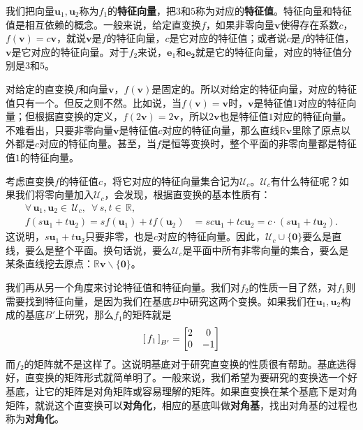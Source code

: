 \documentclass[12pt,UTF8]{ctexbook}
\begin{document}
我们把向量$\mathbf{u}_1,\mathbf{u}_2$称为$f_1$的\textbf{特征向量}，把$3$和$5$称为对应的\textbf{特征值}。特征向量和特征值是相互依赖的概念。一般来说，给定直变换$f$，如果非零向量$\mathbf{v}$使得存在系数$c$，$f(\mathbf{v}) = c\mathbf{v}$，就说$\mathbf{v}$是$f$的特征向量，$c$是它对应的特征值；或者说$c$是$f$的特征值，$\mathbf{v}$是它对应的特征向量。对于$f_2$来说，$\mathbf{e}_1$和$\mathbf{e_2}$就是它的特征向量，对应的特征值分别是$3$和$5$。

对给定的直变换$f$和向量$\mathbf{v}$，$f(\mathbf{v})$是固定的。所以对给定的特征向量，对应的特征值只有一个。但反之则不然。比如说，当$f(\mathbf{v}) = \mathbf{v}$时，$\mathbf{v}$是特征值$1$对应的特征向量；但根据直变换的定义，$f(2\mathbf{v}) = 2\mathbf{v}$，所以$2\mathbf{v}$也是特征值$1$对应的特征向量。不难看出，只要非零向量$\mathbf{v}$是特征值$c$对应的特征向量，那么直线$\mathbb{R}\mathbf{v}$里除了原点以外都是$c$对应的特征向量。甚至，当$f$是恒等变换时，整个平面的非零向量都是特征值$1$的特征向量。

考虑直变换$f$的特征值$c$，将它对应的特征向量集合记为$\mathcal{U}_c$。$\mathcal{U}_c$有什么特征呢？如果我们将零向量加入$\mathcal{U}_c$，会发现，根据直变换的基本性质有：
\begin{align*}
\forall\,\mathbf{u}_1,\mathbf{u}_2\in\,\mathcal{U}_c,\,\,\,\forall \,s, t\in\,\mathbb{R},\qquad\qquad\\
 f(s\mathbf{u}_1+t\mathbf{u}_2) = sf(\mathbf{u}_1)+tf(\mathbf{u}_2) &= sc\mathbf{u}_1 + tc\mathbf{u}_2 = c\cdot(s\mathbf{u}_1+t\mathbf{u}_2).
\end{align*}
这说明，$s\mathbf{u}_1+t\mathbf{u}_2$只要非零，也是$c$对应的特征向量。因此，$\mathcal{U}_c\cup\{\mathbf{0}\}$要么是直线，要么是整个平面。换句话说，要么$\mathcal{U}_c$是平面中所有非零向量的集合，要么是某条直线挖去原点：$\mathbb{R}\mathbf{v}\backslash \{\mathbf{0}\}$。

我们再从另一个角度来讨论特征值和特征向量。我们对$f_2$的性质一目了然，对$f_1$则需要找到特征向量，是因为我们在基底$B$中研究这两个变换。如果我们在$\mathbf{u}_1,\mathbf{u}_2$构成的基底$B'$上研究，那么$f_1$的矩阵就是
$$
\bmat{f_1}[B'] = 
\begin{bmatrix}
    2 & 0  \\ 0 & -1
\end{bmatrix}
$$
而$f_2$的矩阵就不是这样了。这说明基底对于研究直变换的性质很有帮助。基底选得好，直变换的矩阵形式就简单明了。一般来说，我们希望为要研究的变换选一个好基底，让它的矩阵是对角矩阵或容易理解的矩阵。如果直变换在某个基底下是对角矩阵，就说这个直变换可以\textbf{对角化}，相应的基底叫做\textbf{对角基}，找出对角基的过程也称为\textbf{对角化}。
\end{document}
